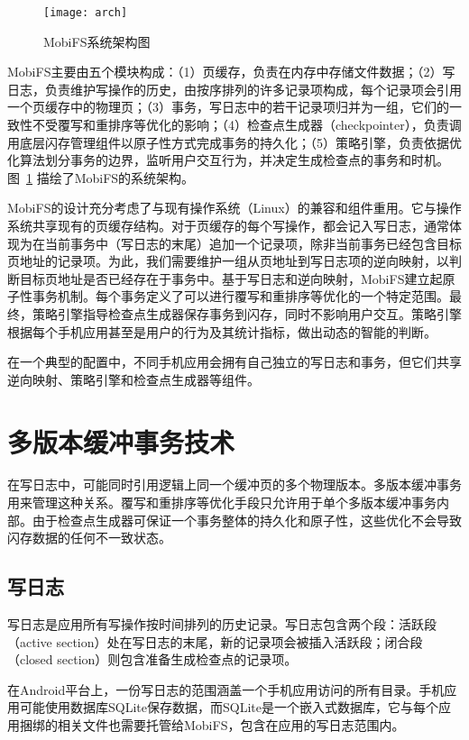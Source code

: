 \begin{figure}
  \centering
  \texttt{[image: arch]}
  \caption{MobiFS系统架构图}
  \label{fig:arch}
\end{figure}

MobiFS主要由五个模块构成：（1）页缓存，负责在内存中存储文件数据；（2）写日志，负责维护写操作的历史，由按序排列的许多记录项构成，每个记录项会引用一个页缓存中的物理页；（3）事务，写日志中的若干记录项归并为一组，它们的一致性不受覆写和重排序等优化的影响；（4）检查点生成器（checkpointer），负责调用底层闪存管理组件以原子性方式完成事务的持久化；（5）策略引擎，负责依据优化算法划分事务的边界，监听用户交互行为，并决定生成检查点的事务和时机。图~\ref{fig:arch} 描绘了MobiFS的系统架构。

MobiFS的设计充分考虑了与现有操作系统（Linux）的兼容和组件重用。它与操作系统共享现有的页缓存结构。对于页缓存的每个写操作，都会记入写日志，通常体现为在当前事务中（写日志的末尾）追加一个记录项，除非当前事务已经包含目标页地址的记录项。为此，我们需要维护一组从页地址到写日志项的逆向映射，以判断目标页地址是否已经存在于事务中。基于写日志和逆向映射，MobiFS建立起原子性事务机制。每个事务定义了可以进行覆写和重排序等优化的一个特定范围。最终，策略引擎指导检查点生成器保存事务到闪存，同时不影响用户交互。策略引擎根据每个手机应用甚至是用户的行为及其统计指标，做出动态的智能的判断。

在一个典型的配置中，不同手机应用会拥有自己独立的写日志和事务，但它们共享逆向映射、策略引擎和检查点生成器等组件。

\section{多版本缓冲事务技术}

在写日志中，可能同时引用逻辑上同一个缓冲页的多个物理版本。多版本缓冲事务用来管理这种关系。覆写和重排序等优化手段只允许用于单个多版本缓冲事务内部。由于检查点生成器可保证一个事务整体的持久化和原子性，这些优化不会导致闪存数据的任何不一致状态。

\subsection{写日志}

写日志是应用所有写操作按时间排列的历史记录。写日志包含两个段：活跃段（active section）处在写日志的末尾，新的记录项会被插入活跃段；闭合段（closed section）则包含准备生成检查点的记录项。 
 
在Android平台上，一份写日志的范围涵盖一个手机应用访问的所有目录。手机应用可能使用数据库SQLite保存数据，而SQLite是一个嵌入式数据库，它与每个应用捆绑的相关文件也需要托管给MobiFS，包含在应用的写日志范围内。
 
